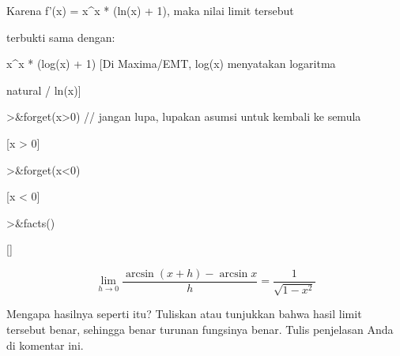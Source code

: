 \documentclass{article}
\newenvironment{eulernotebook}{\par}{\par}
\newenvironment{eulercomment}{\par\medskip}{\par\medskip}
\newenvironment{eulerformula}{}{}
\begin{document}
\begin{eulernotebook}
\begin{eulercomment}
\begin{eulercomment}
\begin{eulercomment}
\begin{eulercomment}
\begin{eulercomment}
\end{eulercomment}
\begin{eulerttcomment}
   Karena f'(x) = x^x * (ln(x) + 1), maka nilai limit tersebut
\end{eulerttcomment}
\begin{eulercomment}
terbukti sama dengan:\\
\end{eulercomment}
\begin{eulerttcomment}
   x^x * (log(x) + 1)  [Di Maxima/EMT, log(x) menyatakan logaritma
\end{eulerttcomment}
\begin{eulercomment}
natural / ln(x)]
\end{eulercomment}
\begin{eulerprompt}
>&forget(x>0) // jangan lupa, lupakan asumsi untuk kembali ke semula
\end{eulerprompt}
\begin{euleroutput}
  
                                 [x > 0]
  
\end{euleroutput}
\begin{eulerprompt}
>&forget(x<0)
\end{eulerprompt}
\begin{euleroutput}
  
                                 [x < 0]
  
\end{euleroutput}
\begin{eulerprompt}
>&facts()
\end{eulerprompt}
\begin{euleroutput}
  
                                    []
  
\end{euleroutput}
\begin{eulerformula}
\[
\lim_{h\rightarrow 0}{\frac{\arcsin \left(x+h\right)-\arcsin x}{h}}=  \frac{1}{\sqrt{1-x^2}}
\]
\end{eulerformula}
\begin{eulercomment}
Mengapa hasilnya seperti itu? Tuliskan atau tunjukkan bahwa hasil
limit tersebut benar, sehingga benar turunan fungsinya benar. Tulis
penjelasan Anda di komentar ini.


\end{eulercomment}
\end{eulercomment}
\end{eulercomment}
\end{eulercomment}
\end{eulercomment}
\end{eulernotebook}
\end{document}
